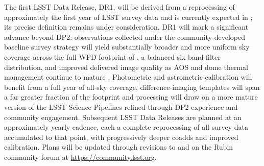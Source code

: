The first \gls{LSST} Data \gls{Release}, \gls{DR1}, will be derived from a reprocessing of approximately the first year of \gls{LSST} survey data and is currently expected in \dronedate; its precise definition remains under consideration.
\gls{DR1} will mark a significant advance beyond \gls{DP2}: observations collected under the community-developed baseline survey strategy \citep[][]{PSTN-053, PSTN-055, PSTN-056, PSTN-057} will yield substantially broader and more uniform sky coverage across the full \gls{WFD} footprint of \wfdarea, a balanced six-band filter distribution, and improved delivered image quality as \gls{AOS} and dome thermal management continue to mature \citep[][]{SOTN-004}.
Photometric and astrometric calibration will benefit from a full year of all-sky coverage, difference-imaging templates will span a far greater fraction of the footprint and processing will draw on a more mature version of the \gls{LSST} \gls{Science Pipelines} refined through \gls{DP2} experience and community engagement.
Subsequent \gls{LSST} Data Releases are planned at an approximately yearly cadence, each a complete reprocessing of all survey data accumulated to that point, with progressively deeper coadds and improved \gls{calibration}.
Plans will be updated through revisions to \citet[][]{RTN-011} and on the Rubin community forum at \url{https://community.lsst.org}.